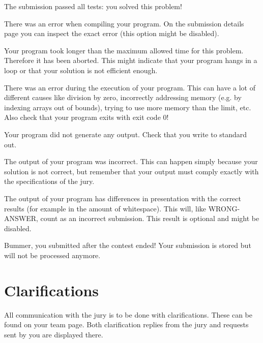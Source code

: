 \begin{description}[\setleftmargin{4.5cm}]
\item[CORRECT]
The submission passed all tests: you solved this problem!

\item[COMPILER-ERROR]
There was an error when compiling your program. On the submission
details page you can inspect the exact error (this option might be
disabled).

\item[TIMELIMIT]
Your program took longer than the maximum allowed time for this
problem. Therefore it has been aborted. This might indicate that your
program hangs in a loop or that your solution is not efficient
enough.

\item[RUN-ERROR]
There was an error during the execution of your program. This can have
a lot of different causes like division by zero, incorrectly
addressing memory (e.g. by indexing arrays out of bounds), trying to
use more memory than the limit, etc.
Also check that your program exits with exit code 0!

\item[NO-OUTPUT]
Your program did not generate any output. Check that you write to
standard out.

\item[WRONG-ANSWER]
The output of your program was incorrect. This can happen simply
because your solution is not correct, but remember that your output
must comply exactly with the specifications of the jury.

\item[PRESENTATION-ERROR]
The output of your program has differences in presentation with the
correct results (for example in the amount of whitespace). This will,
like WRONG-ANSWER, count as an incorrect submission. This result is
optional and might be disabled.

\item[TOO-LATE]
Bummer, you submitted after the contest ended! Your submission is
stored but will not be processed anymore.
\end{description}

\section{Clarifications}

All communication with the jury is to be done with clarifications.
These can be found on your team page. Both clarification replies from
the jury and requests sent by you are displayed there.

